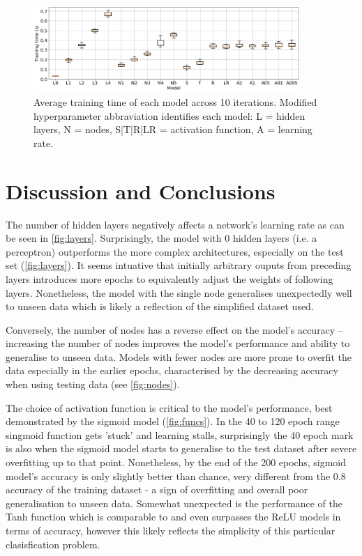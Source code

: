 \documentclass[12pt]{article}
\begin{document}
\begin{figure}[H]
  \centering
  \includegraphics[width=0.9\textwidth]{figs/times.png}
  \caption{
    Average training time of each model across 10 iterations.
    Modified hyperparameter abbraviation identifies each model:
    L = hidden layers, N = nodes, S|T|R|LR = activation function,
    A = learning rate.
  }
  \label{fig:times}
\end{figure}

\section{Discussion and Conclusions}

The number of hidden layers negatively affects a network's learning rate as can be seen in \ref{fig:layers}. Surprisingly, the model with 0 hidden layers (i.e. a perceptron) outperforms the more complex architectures, especially on the test set (\ref{fig:layers}). It seems intuative that initially arbitrary ouputs from preceding layers introduces more epochs to equivalently adjust the weights of following layers. Nonetheless, the model with the single node generalises unexpectedly well to unseen data which is likely a reflection of the simplified dataset used.

Conversely, the number of nodes has a reverse effect on the model's accuracy -- increasing the number of nodes improves the model's performance and ability to generalise to unseen data. Models with fewer nodes are more prone to overfit the data especially in the earlier epochs, characterised by the decreasing accuracy when using testing data (see \ref{fig:nodes}).

The choice of activation function is critical to the model's performance, best demonstrated by the sigmoid model (\ref{fig:funcs}). In the 40 to 120 epoch range singmoid function gets 'stuck' and learning stalls, surprisingly the 40 epoch mark is also when the sigmoid model starts to generalise to the test dataset after severe overfitting up to that point. Nonetheless, by the end of  the 200 epochs, sigmoid model's accuracy is only slightly better than chance, very different from the 0.8 accuracy of the training dataset - a sign of overfitting and overall poor generalisation to unseen data.
Somewhat unexpected is the performance of the Tanh function which is comparable to and even surpasses the ReLU models in terms of accuracy, however this likely reflects the simplicity of this particular clasisfication problem.
\end{document}
